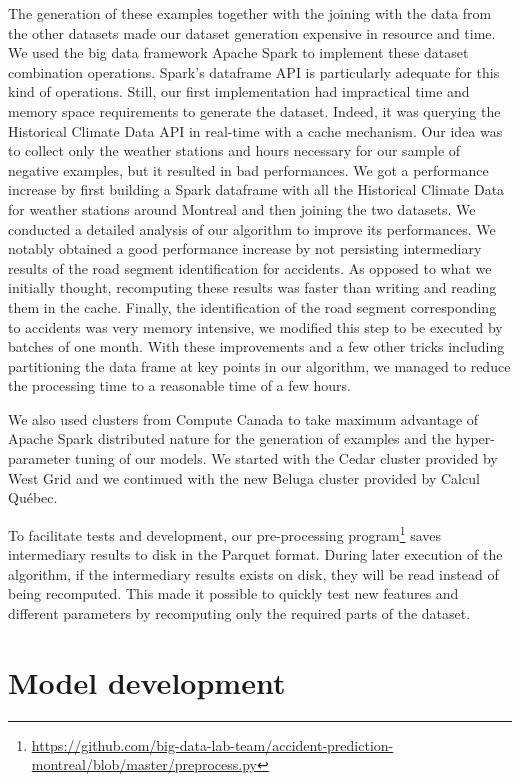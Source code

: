 \documentclass[conference]{IEEEtran}
\begin{document}
The generation of these examples together with the
joining with the data from the other datasets made our dataset
generation expensive in resource and time. We used the big data framework
Apache Spark \cite{Zaharia2016} to implement these dataset combination
operations. Spark's dataframe API is particularly adequate
for this kind of operations. Still, our first implementation had impractical
time and memory space requirements to generate the dataset. Indeed, it was querying
the Historical Climate Data API in real-time with a cache mechanism. Our
idea was to collect only the weather stations and hours necessary for our
sample of negative examples, but it resulted in bad performances. We got a
performance increase by first building a Spark dataframe with all the
Historical Climate Data for weather stations around Montreal and then
joining the two datasets. We conducted a detailed analysis of our algorithm
to improve its performances. We notably obtained a good performance
increase by not persisting intermediary results of the road segment
identification for accidents. As opposed to what we initially thought,
recomputing these results was faster than writing and reading them in the
cache. Finally, the identification of the road segment corresponding to
accidents was very memory intensive, we modified this step to be executed
by batches of one month. With these improvements and a few other tricks
including partitioning the data frame at key points in our algorithm, we
managed to reduce the processing time to a reasonable time of a few hours.

We also used clusters from Compute Canada to take maximum advantage of Apache Spark distributed nature for the generation of examples and the hyper-parameter tuning of our models. We started with the Cedar cluster provided by West Grid and we continued with the new Beluga cluster provided by Calcul Québec.

To facilitate tests and development, our pre-processing program\footnote{\url{https://github.com/big-data-lab-team/accident-prediction-montreal/blob/master/preprocess.py}} saves intermediary results to disk in the Parquet format. During later execution of the algorithm, if the intermediary results exists on disk, they will be read instead of being recomputed. This made it possible to quickly test new features and different parameters by recomputing only the required parts of the dataset.

\section{Model development}
\end{document}
